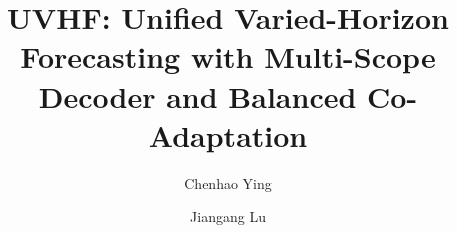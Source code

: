 \documentclass[final,3p,times]{elsarticle}
\begin{document}
\begin{frontmatter}



\title{UVHF: Unified Varied-Horizon Forecasting with Multi-Scope Decoder and Balanced Co-Adaptation}


\author{Chenhao Ying}
\author{Jiangang Lu}
\address{{State Key Laboratory of Industrial Control Technology, College of Control Science and Engineering, Zhejiang University},
            {Hangzhou},
            {310027},
            {Zhejiang},
            {China}}





\end{frontmatter}
\end{document}
